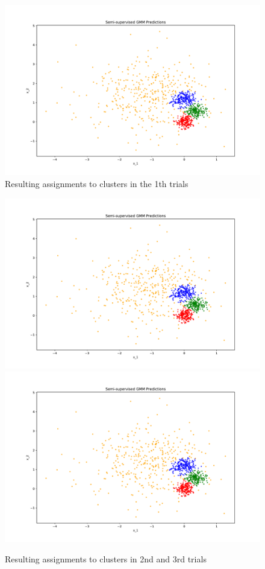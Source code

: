 \begin{answer}
\begin{figure}[htbp] 
	\centering
	\includegraphics[scale=0.5]{tex/04-semi_supervised_em/p03_pred_ss_0.pdf}
	\caption{Resulting assignments to clusters in the 1th trials}
\end{figure}
\begin{figure}[htbp] 
	\centering
	\includegraphics[scale=0.5]{tex/04-semi_supervised_em/p03_pred_ss_1.pdf}
	\includegraphics[scale=0.5]{tex/04-semi_supervised_em/p03_pred_ss_2.pdf}
	\caption{Resulting assignments to clusters in 2nd and 3rd trials}
\end{figure}
\end{answer}
